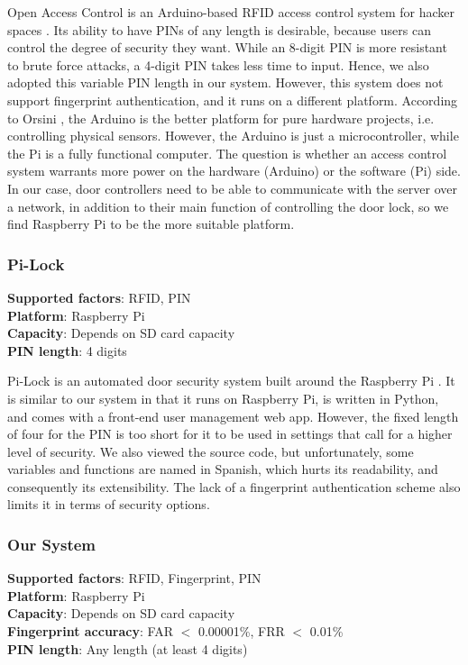 \noindent Open Access Control is an Arduino-based RFID access control system for hacker spaces \cite{OpenAccessControl}. Its ability to have PINs of any length is desirable, because users can control the degree of security they want. While an 8-digit PIN is more resistant to brute force attacks, a 4-digit PIN takes less time to input. Hence, we also adopted this variable PIN length in our system. However, this system does not support fingerprint authentication, and it runs on a different platform. According to Orsini \cite{ArduinoVsPi}, the Arduino is the better platform for pure hardware projects, i.e. controlling physical sensors. However, the Arduino is just a microcontroller, while the Pi is a fully functional computer. The question is whether an access control system warrants more power on the hardware (Arduino) or the software (Pi) side. In our case, door controllers need to be able to communicate with the server over a network, in addition to their main function of controlling the door lock, so we find Raspberry Pi to be the more suitable platform.

\subsubsection{Pi-Lock}
\begin{spacing}{1.35}
\textbf{Supported factors}: RFID, PIN \\
\textbf{Platform}: Raspberry Pi \\
\textbf{Capacity}: Depends on SD card capacity \\
\textbf{PIN length}: 4 digits \\
\end{spacing}

\noindent Pi-Lock is an automated door security system built around the Raspberry Pi \cite{PiLock}. It is similar to our system in that it runs on Raspberry Pi, is written in Python, and comes with a front-end user management web app. However, the fixed length of four for the PIN is too short for it to be used in settings that call for a higher level of security. We also viewed the source code, but unfortunately, some variables and functions are named in Spanish, which hurts its readability, and consequently its extensibility. The lack of a fingerprint authentication scheme also limits it in terms of security options.

\subsubsection{Our System}
\begin{spacing}{1.35}
\textbf{Supported factors}: RFID, Fingerprint, PIN \\
\textbf{Platform}: Raspberry Pi \\
\textbf{Capacity}: Depends on SD card capacity \\
\textbf{Fingerprint accuracy}: FAR $<$ 0.00001\%, FRR $<$ 0.01\% \\
\textbf{PIN length}: Any length (at least 4 digits) \\
\end{spacing}

